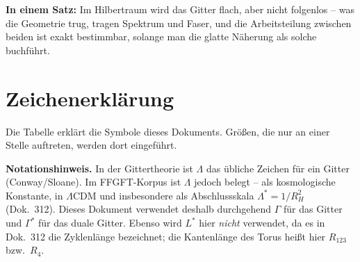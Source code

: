 \documentclass[11pt]{report}
\begin{document}
\medskip
\noindent\textbf{In einem Satz:} Im Hilbertraum wird das Gitter
flach, aber nicht folgenlos -- was die Geometrie trug, tragen
Spektrum und Faser, und die Arbeitsteilung zwischen beiden ist
exakt bestimmbar, solange man die glatte Näherung als solche
buchführt.

\section*{Zeichenerklärung}

Die Tabelle erklärt die Symbole dieses Dokuments. Größen, die nur an
einer Stelle auftreten, werden dort eingeführt.

\textbf{Notationshinweis.} In der Gittertheorie ist $\Lambda$ das
übliche Zeichen für ein Gitter (Conway/Sloane). Im FFGFT-Korpus ist
$\Lambda$ jedoch belegt -- als kosmologische Konstante, in
$\Lambda$CDM und insbesondere als Abschlussskala $\Lambda^{*} =
1/R_H^2$ (Dok.~312). Dieses Dokument verwendet deshalb
durchgehend $\Gamma$ für das Gitter und $\Gamma^{*}$ für das duale
Gitter. Ebenso wird $L^{*}$ hier \emph{nicht} verwendet, da es in
Dok.~312 die Zyklenlänge bezeichnet; die Kantenlänge des Torus
heißt hier $R_{123}$ bzw.\ $R_4$.
\end{document}
